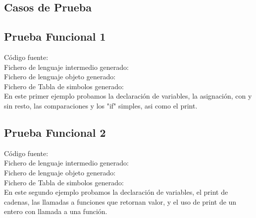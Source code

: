 \documentclass{article}[a4paper]
\begin{document}
\newpage
\begin{appendices}

\section{Casos de Prueba}

\subsection{Prueba Funcional 1}

Código fuente:
\\
\hspace{\parindent} Fichero de lenguaje intermedio generado:
\\
\hspace{\parindent} Fichero de lenguaje objeto generado:
\\
\hspace{\parindent} Fichero de Tabla de simbolos generado:
\\

En este primer ejemplo probamos la declaración de variables, la asignación, con y sin resto, 
las comparaciones y los "if" simples, asi como el print.

\subsection{Prueba Funcional 2}

Código fuente:
\\
\hspace{\parindent} Fichero de lenguaje intermedio generado:
\\
\hspace{\parindent} Fichero de lenguaje objeto generado:
\\
\hspace{\parindent} Fichero de Tabla de simbolos generado:
\\

En este segundo ejemplo probamos la declaración de variables, el print de cadenas, las llamadas a funciones que retornan valor, y el uso de print de un entero con llamada a una función.


\end{appendices}
\end{document}
